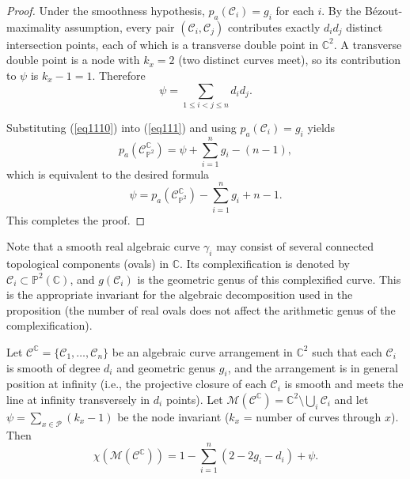 \documentclass[article,11pt]{amsart} \numberwithin{equation}{section}
\numberwithin{equation}{section}
\begin{document}
{\begin{proof}
	Under the smoothness hypothesis, $p_a(\mathscr{C}_i) = g_i$ for each $i$.
	By the B\'ezout-maximality assumption, every pair $(\mathscr{C}_i,\mathscr{C}_j)$ contributes exactly $d_i d_j$ distinct intersection points, each of which is a transverse double point in $\mathbb{C}^2$. A transverse double point is a node with $k_x = 2$ (two distinct curves meet), so its contribution to $\psi$ is $k_x-1 = 1$. Therefore
	\begin{equation}\label{eq1110}
		\psi = \sum_{1\le i<j\le n} d_i d_j.
	\end{equation}

	Substituting (\ref{eq1110}) into (\ref{eq111}) and using $p_a(\mathscr{C}_i)=g_i$ yields
	\[
	p_a(\mathcal{C}^\mathbb{C}_{\mathbb{P}^2}) = \psi + \sum_{i=1}^n g_i - (n-1),
	\]
	which is equivalent to the desired formula
	\[
	\psi = p_a(\mathcal{C}^\mathbb{C}_{\mathbb{P}^2}) - \sum_{i=1}^n g_i + n - 1.
	\]
	This completes the proof.
\end{proof}

\begin{rk}
	Note that a smooth real algebraic curve $\gamma_i$ may consist of several connected topological components (ovals) in $\mathbb{C}$. Its complexification is denoted by $\mathscr{C}_i \subset \mathbb{P}^2(\mathbb{C})$, and $g(\mathscr{C}_i)$ is the geometric genus of this complexified curve. This is the appropriate invariant for the algebraic decomposition used in the proposition (the number of real ovals does not affect the arithmetic genus of the complexification)\cite{BochnakCosteRoy,BenedettiRisler}.
\end{rk}

\begin{thm}\label{thm:5.9}
	Let $\mathcal{C}^\mathbb{C} = \{\mathscr{C}_1,\dots,\mathscr{C}_n\}$ be an algebraic curve arrangement in $\mathbb{C}^2$ such that each $\mathscr{C}_i$ is smooth of degree $d_i$ and geometric genus $g_i$, and the arrangement is in general position at infinity \cite{DimcaLibgober2006} (i.e., the projective closure of each $\mathscr{C}_i$ is smooth and meets the line at infinity transversely in $d_i$ points). Let $\mathcal{M}(\mathcal{C}^\mathbb{C}) = \mathbb{C}^2 \setminus \bigcup_i \mathscr{C}_i$ and let $\psi = \sum_{x\in\mathcal{P}}(k_x-1)$ be the node invariant ($k_x$ = number of curves through $x$). Then
	\begin{equation}\label{123}
	\chi(\mathcal{M}(\mathcal{C}^\mathbb{C})) = 1 - \sum_{i=1}^n (2-2g_i-d_i) + \psi.
	\end{equation}
\end{thm}

}
\end{document}

